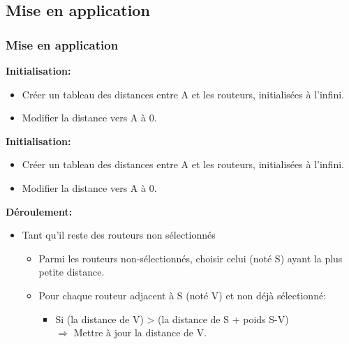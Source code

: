 \documentclass[svgnames,11pt]{beamer}
\begin{document}
\subsection{Mise en application}
\begin{frame}[fragile]
    \frametitle{Mise en application}
\textbf{Initialisation:}
\begin{itemize}
    \item Créer un tableau des distances entre A et les routeurs, initialisées à l'infini.
    \item Modifier la distance vers A à 0.
\end{itemize}
\end{frame}
\begin{frame}[fragile]
\textbf{Initialisation:}
\begin{itemize}
    \item Créer un tableau des distances entre A et les routeurs, initialisées à l'infini.
    \item Modifier la distance vers A à 0.
\end{itemize}
\textbf{Déroulement:}
\begin{itemize}
    \item Tant qu'il reste des routeurs non sélectionnés
    \begin{itemize}
        \item Parmi les routeurs non-sélectionnés, choisir celui (noté S) ayant la plus petite distance.
        \item Pour chaque routeur adjacent à S (noté V) et non déjà sélectionné:
            \begin{itemize}
                \item Si (la distance de V) > (la distance de S + poids S-V)
                \\\hspace{1cm}$\Rightarrow$ Mettre à jour la distance de V.
            \end{itemize}
    \end{itemize}
\end{itemize}
\end{frame}
\end{document}
